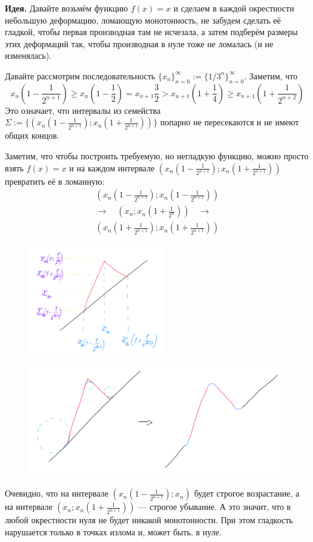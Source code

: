 \documentclass[12pt,a4paper]{article}
\begin{document}
    \begin{enumproblem}
        \textbf{Идея.} Давайте возьмём функцию $f(x) = x$ и сделаем в каждой окрестности небольшую деформацию, ломающую монотонность, не забудем сделать её гладкой, чтобы первая производная там не исчезала, а затем подберём размеры этих деформаций так, чтобы производная в нуле тоже не ломалась (и не изменялась).

        Давайте рассмотрим последовательность $\{x_n\}_{n=0}^\infty := \{1/3^n\}_{n=0}^\infty$. Заметим, что
        \[x_n\left(1-\frac{1}{2^{n+1}}\right) \geqslant x_n\left(1-\frac{1}{2}\right) = x_{n+1}\frac{3}{2} > x_{n+1}\left(1 + \frac{1}{4}\right) \geqslant x_{n+1}\left(1 + \frac{1}{2^{n+2}}\right)\]
        Это означает, что интервалы из семейства $\Sigma := \{(x_n(1-\frac{1}{2^{n+1}}); x_n(1+\frac{1}{2^{n+1}}))\}$ попарно не пересекаются и не имеют общих концов.

        Заметим, что чтобы построить требуемую, но негладкую функцию, можно просто взять $f(x) = x$ и на каждом интервале $(x_n(1-\frac{1}{2^{n+1}}); x_n(1+\frac{1}{2^{n+1}}))$ превратить её в ломанную:
        \begin{multline*}
            \left(x_n\left(1-\frac{1}{2^{n+1}}\right); x_n\left(1-\frac{1}{2^{n+1}}\right)\right) \\
            \longrightarrow \quad \left(x_n; x_n\left(1+\frac{1}{2^n}\right)\right) \quad \longrightarrow\\
            \left(x_n\left(1+\frac{1}{2^{n+1}}\right); x_n\left(1+\frac{1}{2^{n+1}}\right)\right)
        \end{multline*}
        \begin{figure}[H]
            \centering
            \includegraphics[height=5cm]{MA-practice-solutions-002-02-1.pdf}
            \includegraphics[height=5cm]{MA-practice-solutions-002-02-2.pdf}
        \end{figure}
        Очевидно, что на интервале $(x_n(1-\frac{1}{2^{n+1}}); x_n)$ будет строгое возрастание, а на интервале $(x_n; x_n(1+\frac{1}{2^{n+1}}))$ --- строгое убывание. А это значит, что в любой окрестности нуля не будет никакой монотонности. При этом гладкость нарушается только в точках излома и, может быть, в нуле.
        

\end{enumproblem}
\end{document}
